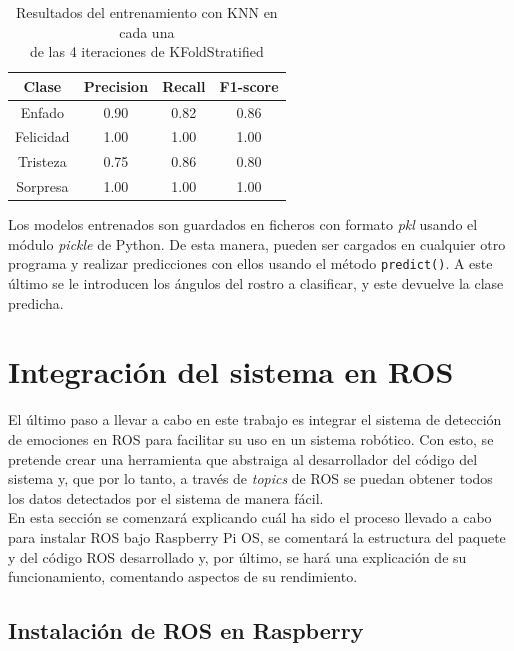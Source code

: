 \begin{table}[h]
\begin{minipage}{0.48\linewidth}
\begin{adjustbox}{max width=\textwidth}
\begin{tabular}{|c|c|c|c|}
\hline
\textbf{Clase} & \textbf{Precision} & \textbf{Recall} & \textbf{F1-score}\\
\hline
     Enfado & 0.90 & 0.82 & 0.86\\
     Felicidad & 1.00 & 1.00 & 1.00\\
     Tristeza & 0.75 & 0.86 & 0.80\\
     Sorpresa & 1.00 & 1.00 & 1.00\\
\hline
\end{tabular}
\end{adjustbox}
\end{minipage}
\captionsetup{justification=centering}
\caption{Resultados del entrenamiento con KNN en cada una\\
de las 4 iteraciones de KFoldStratified}
\label{cuadro:resultados_KNN_emociones}
\end{table}

Los modelos entrenados son guardados en ficheros con formato \textit{pkl} usando el módulo \textit{pickle} de Python. De esta manera, pueden ser cargados en cualquier otro programa y realizar predicciones con ellos usando el método \verb|predict()|. A este último se le introducen los ángulos del rostro a clasificar, y este devuelve la clase predicha.\\

\section{Integración del sistema en ROS}
\label{sec:integración_en_ros}

El último paso a llevar a cabo en este trabajo es integrar el sistema de detección de emociones en ROS para facilitar su uso en un sistema robótico. Con esto, se pretende crear una herramienta que abstraiga al desarrollador del código del sistema y, que por lo tanto, a través de \textit{topics} de ROS se puedan obtener todos los datos detectados por el sistema de manera fácil.\\

En esta sección se comenzará explicando cuál ha sido el proceso llevado a cabo para instalar ROS bajo Raspberry Pi OS, se comentará la estructura del paquete y del código ROS desarrollado y, por último, se hará una explicación de su funcionamiento, comentando aspectos de su rendimiento.

\subsection{Instalación de ROS en Raspberry}

